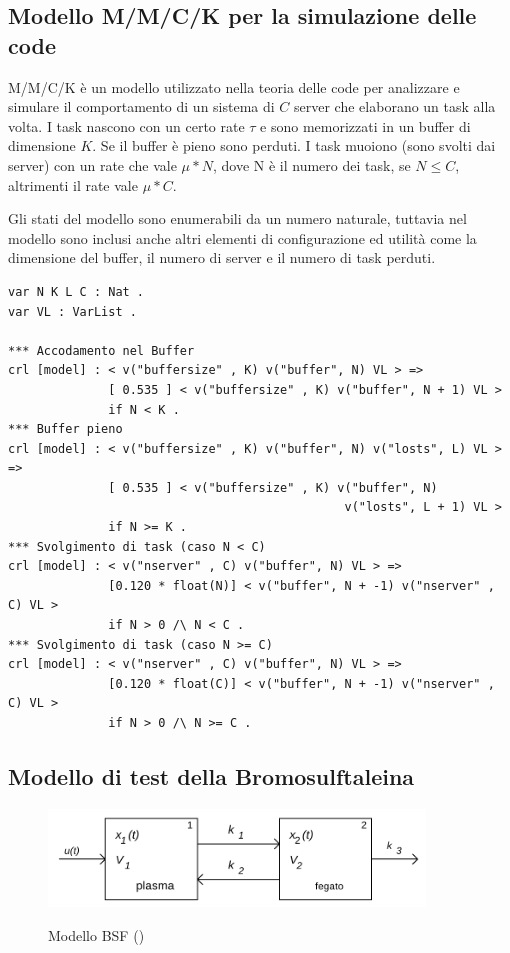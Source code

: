 \subsection{Modello M/M/C/K per la simulazione delle code}

M/M/C/K è un modello utilizzato nella teoria delle code per analizzare e
simulare il comportamento di un sistema di $C$ server che elaborano un task
alla volta. I task nascono con un certo rate $\tau$ e sono memorizzati in un
buffer di dimensione $K$. Se il buffer è pieno sono perduti. I task muoiono
(sono svolti dai server) con un rate che vale $\mu * N$, dove N è il numero dei
task, se $N \leq C$, altrimenti il rate vale $\mu * C$.

Gli stati del modello sono enumerabili da un numero naturale, tuttavia nel
modello sono inclusi anche altri elementi di configurazione ed utilità come la
dimensione del buffer, il numero di server e il numero di task perduti.

\begin{Verbatim}[fontsize=\small]
var N K L C : Nat .
var VL : VarList .

*** Accodamento nel Buffer
crl [model] : < v("buffersize" , K) v("buffer", N) VL > =>
              [ 0.535 ] < v("buffersize" , K) v("buffer", N + 1) VL >
              if N < K .
*** Buffer pieno
crl [model] : < v("buffersize" , K) v("buffer", N) v("losts", L) VL > =>
              [ 0.535 ] < v("buffersize" , K) v("buffer", N)
                                               v("losts", L + 1) VL >
              if N >= K .
*** Svolgimento di task (caso N < C)
crl [model] : < v("nserver" , C) v("buffer", N) VL > =>
              [0.120 * float(N)] < v("buffer", N + -1) v("nserver" , C) VL >
              if N > 0 /\ N < C .
*** Svolgimento di task (caso N >= C)
crl [model] : < v("nserver" , C) v("buffer", N) VL > =>
              [0.120 * float(C)] < v("buffer", N + -1) v("nserver" , C) VL >
              if N > 0 /\ N >= C .

\end{Verbatim}

\subsection{Modello di test della Bromosulftaleina}

\begin{figure}[!ht]
	\includegraphics[width=10cm]{../resources/images/BSF.png}
	\label{bsf}
	\caption{Modello BSF (\cite{gnudi})}
\end{figure}

